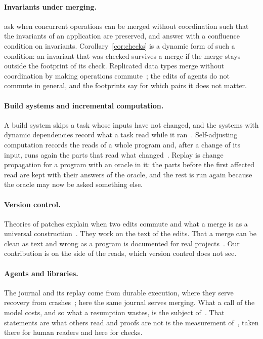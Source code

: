 \documentclass[acmsmall,nonacm,screen]{acmart}
\begin{document}
\paragraph{Invariants under merging.} \citet{bailis2014} ask when concurrent operations can
be merged without coordination such that the invariants of an application are preserved, and
answer with a confluence condition on invariants. Corollary~\ref{cor:checks} is a dynamic
form of such a condition: an invariant that was checked survives a merge if the merge stays
outside the footprint of its check. Replicated data types merge without coordination by
making operations commute~\citep{shapiro2011}; the edits of agents do not commute in
general, and the footprints say for which pairs it does not matter.

\paragraph{Build systems and incremental computation.} A build system skips a task whose
inputs have not changed, and the systems with dynamic dependencies record what a task read
while it ran~\citep{mokhov2018}. Self-adjusting computation records the reads of a whole
program and, after a change of its input, runs again the parts that read what
changed~\citep{acar2002}. Replay is change propagation for a program with an oracle in it:
the parts before the first affected read are kept with their answers of the oracle, and the
rest is run again because the oracle may now be asked something else.

\paragraph{Version control.} Theories of patches explain when two edits commute and what a
merge is as a universal construction~\citep{mimram2013,angiuli2014}. They work on the text of
the edits. That a merge can be clean as text and wrong as a program is documented for real
projects~\citep{brun2011}. Our contribution is on the side of the reads, which version
control does not see.

\paragraph{Agents and libraries.} The journal and its replay come from durable execution,
where they serve recovery from crashes~\citep{tpp8}; here the same journal serves merging.
What a call of the model costs, and so what a resumption wastes, is the subject
of~\citet{tpp6}. That statements are what others read and proofs are not is the measurement
of~\citet{tpp1}, taken there for human readers and here for checks.
\end{document}
